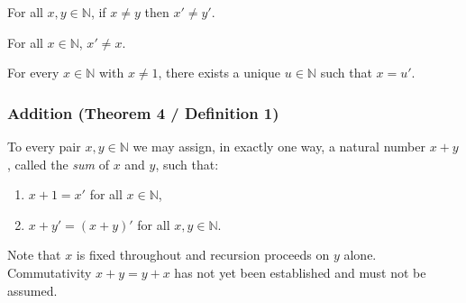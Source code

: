 \begin{theorem}
\label{thm:landau-succ-strict}
For all $x, y \in \mathbb{N}$, if $x \neq y$ then $x' \neq y'$.
\end{theorem}

\begin{theorem}
\label{thm:landau-succ-ne-self}
For all $x \in \mathbb{N}$, $x' \neq x$.
\end{theorem}

\begin{theorem}
\label{thm:landau-pred-unique}
For every $x \in \mathbb{N}$ with $x \neq 1$, there exists a unique
$u \in \mathbb{N}$ such that $x = u'$.
\end{theorem}

\subsubsection*{Addition (Theorem 4 / Definition 1)}

\begin{theorem}
\label{thm:landau-addition-exists-unique}
To every pair $x, y \in \mathbb{N}$ we may assign, in exactly one way,
a natural number $x + y$, called the \emph{sum} of $x$ and $y$, such that:
\begin{enumerate}
  \item[\textbf{A6.}] $x + 1 = x'$ \quad for all $x \in \mathbb{N}$,
  \item[\textbf{A7.}] $x + y' = (x + y)'$ \quad for all $x, y \in \mathbb{N}$.
\end{enumerate}
\end{theorem}

\begin{remark*}
Note that $x$ is fixed throughout and recursion proceeds on $y$ alone.
Commutativity $x + y = y + x$ has not yet been established and must not
be assumed.
\end{remark*}

